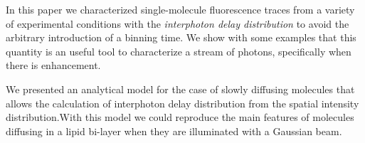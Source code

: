 In this paper we characterized single-molecule fluorescence traces 
from a variety of experimental conditions with the \textit{interphoton
delay distribution} to avoid the arbitrary introduction of a binning time. 
We show with some examples that this quantity is an useful tool to characterize
a stream of photons, specifically when there is enhancement.

We presented an analytical model for the case of slowly diffusing molecules that
allows the calculation of interphoton delay distribution from the spatial intensity 
distribution.With this model we could reproduce the main features of molecules diffusing 
in a lipid bi-layer when they are illuminated with a Gaussian beam.


